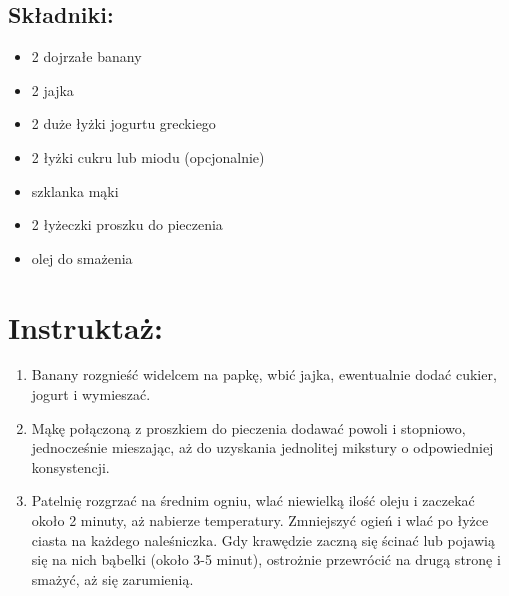\documentclass[a4paper,10pt]{book}
\begin{document}
\begin{multicols}{2}

\section*{Składniki:} \begin{itemize} \item 2 dojrzałe banany \item 2 jajka \item 2 duże łyżki jogurtu greckiego \item 2 łyżki cukru lub miodu (opcjonalnie) \item szklanka mąki \item 2 łyżeczki proszku do pieczenia \item olej do smażenia \end{itemize}

\columnbreak

\begin{figure}[H] \centering 
{}
\end{figure}

\end{multicols}

\vspace{0.5cm}

\section*{Instruktaż:} \begin{enumerate} \item Banany rozgnieść widelcem na papkę, wbić jajka, ewentualnie dodać cukier, jogurt i wymieszać. \item Mąkę połączoną z proszkiem do pieczenia dodawać powoli i stopniowo, jednocześnie mieszając, aż do uzyskania jednolitej mikstury o odpowiedniej konsystencji. \item Patelnię rozgrzać na średnim ogniu, wlać niewielką ilość oleju i zaczekać około 2 minuty, aż nabierze temperatury. Zmniejszyć ogień i wlać po łyżce ciasta na każdego naleśniczka. Gdy krawędzie zaczną się ścinać lub pojawią się na nich bąbelki (około 3-5 minut), ostrożnie przewrócić na drugą stronę i smażyć, aż się zarumienią. \end{enumerate}
\end{document}
